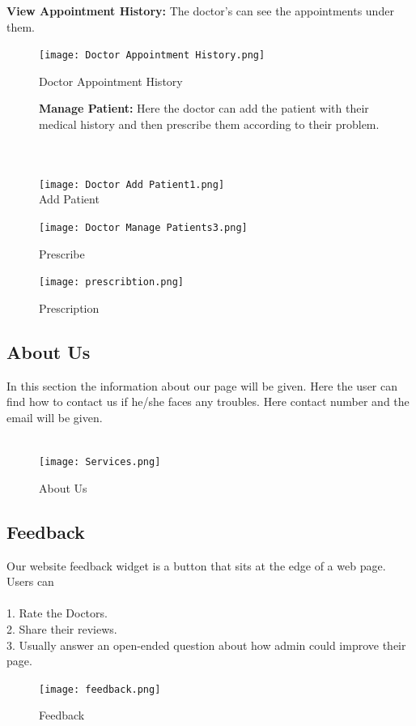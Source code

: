 \documentclass[14pt,a4paper,calibribody]{article}
\begin{document}
\textbf{View Appointment History:} The doctor's can see the appointments under them.\\
\begin{figure}[h]
\texttt{[image: Doctor Appointment History.png]}\\
\caption{Doctor Appointment History}
\end{figure}
\clearpage
\begin{figure}[h]
\textbf{Manage Patient:} Here the doctor can add the patient with their medical history and then prescribe them according to their problem.\\\\\\
\begin{center}
\texttt{[image: Doctor Add Patient1.png]}\\
\caption{Add Patient}
\vspace{0.2in}
\texttt{[image: Doctor Manage Patients3.png]}
\caption{Prescribe}
\end{center}
\end{figure}
\clearpage
\begin{figure}[h]
\texttt{[image: prescribtion.png]}\\
\caption{Prescription}
\end{figure}
\subsection{About Us}
In this section the information about our page will be given. Here the user can find how to contact us if he/she faces any troubles. Here contact number and the email will be given. \\\\ 
\begin{figure}[h]
\begin{center}
\texttt{[image: Services.png]}
\caption{About Us}
\end{center}
\end{figure}
\clearpage
\subsection{Feedback}
Our website feedback widget is a button that sits at the edge of a web page. Users can \\\\
1.	Rate the Doctors.\\
2.	Share their reviews.\\ 
3.	Usually answer an open-ended question about how admin could improve their page.\\
\begin{figure}[h]
\begin{center}
\texttt{[image: feedback.png]}
\caption{Feedback}
\end{center}
\end{figure}
\clearpage
\end{document}
